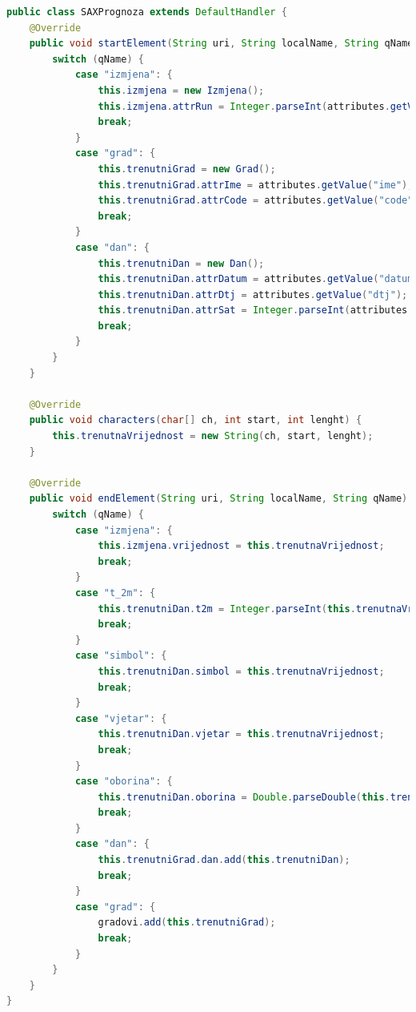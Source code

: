 \documentclass{foi}
\begin{document}
\begin{lstlisting}[language=java, caption={Primjer implementacije metoda za prihvačanje događaja}]
public class SAXPrognoza extends DefaultHandler {
    @Override
    public void startElement(String uri, String localName, String qName, Attributes attributes) {
        switch (qName) {
            case "izmjena": {
                this.izmjena = new Izmjena();
                this.izmjena.attrRun = Integer.parseInt(attributes.getValue("run"));
                break;
            }
            case "grad": {
                this.trenutniGrad = new Grad();
                this.trenutniGrad.attrIme = attributes.getValue("ime");
                this.trenutniGrad.attrCode = attributes.getValue("code");
                break;
            }
            case "dan": {
                this.trenutniDan = new Dan();
                this.trenutniDan.attrDatum = attributes.getValue("datum");
                this.trenutniDan.attrDtj = attributes.getValue("dtj");
                this.trenutniDan.attrSat = Integer.parseInt(attributes.getValue("sat"));
                break;
            }
        }
    }

    @Override
    public void characters(char[] ch, int start, int lenght) {
        this.trenutnaVrijednost = new String(ch, start, lenght);
    }

    @Override
    public void endElement(String uri, String localName, String qName) {
        switch (qName) {
            case "izmjena": {
                this.izmjena.vrijednost = this.trenutnaVrijednost;
                break;
            }
            case "t_2m": {
                this.trenutniDan.t2m = Integer.parseInt(this.trenutnaVrijednost);
                break;
            }
            case "simbol": {
                this.trenutniDan.simbol = this.trenutnaVrijednost;
                break;
            }
            case "vjetar": {
                this.trenutniDan.vjetar = this.trenutnaVrijednost;
                break;
            }
            case "oborina": {
                this.trenutniDan.oborina = Double.parseDouble(this.trenutnaVrijednost);
                break;
            }
            case "dan": {
                this.trenutniGrad.dan.add(this.trenutniDan);
                break;
            }
            case "grad": {
                gradovi.add(this.trenutniGrad);
                break;
            }
        }
    }
}
\end{lstlisting}
\end{document}
